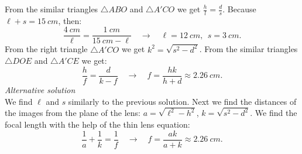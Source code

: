 {\begin{center}
\end{center}
From the similar triangles $\triangle ABO$ and $\triangle A'CO$ we get $\frac hl = \frac ds$. Because $\ell +s = \SI{15}{cm}$, then:
$$\frac {\SI{4}{cm}}{\ell} = \frac{\SI{1}{cm}}{\SI{15}{cm}-\ell} \quad \rightarrow \quad \ell = \SI{12}{cm},\ \ s = \SI{3}{cm}.$$ 
From the right triangle $\triangle A'CO$ we get $k^2=\sqrt{s^2-d^2}$. From the similar triangles $\triangle DOE$ and $\triangle A'CE$ we get:
$$\frac{h}{f} = \frac{d}{k-f}\quad\rightarrow\quad f=\frac{hk}{h+d} \approx \SI{2.26}{cm}.$$ 
\emph{Alternative solution}\\
We find $\ell$ and $s$ similarly to the previous solution. Next we find the distances of the images from the plane of the lens: $a = \sqrt{\ell^2-h^2}$, $k=\sqrt{s^2-d^2}$. We find the focal length with the help of the thin lens equation:
$$\frac 1 a + \frac 1 k = \frac 1 f \quad\rightarrow\quad f=\frac{ak}{a+k}\approx \SI{2.26}{cm}.$$
\fi
}